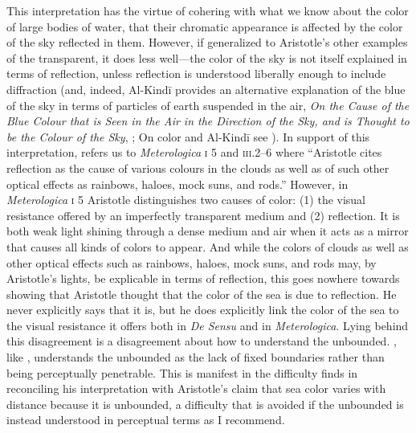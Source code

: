This interpretation has the virtue of cohering with what we know about the color of large bodies of water, that their chromatic appearance is affected by the color of the sky reflected in them. However, if generalized to Aristotle's other examples of the transparent, it does less well---the color of the sky is not itself explained in terms of reflection, unless reflection is understood liberally enough to include diffraction (and, indeed, Al-Kind\={i} provides an alternative explanation of the blue of the sky in terms of particles of earth suspended in the air, \emph{On the Cause of the Blue Colour that is Seen in the Air in the Direction of the Sky, and is Thought to be the Colour of the Sky}, \citealt[139--143]{Adamson:2012fk}; On color and Al-Kind\=i see \citealt{Adamson:2006ys}). In support of this interpretation, \citet[130]{Sorabji:2004fk} refers us to \emph{Meterologica} \textsc{i} 5 and \textsc{iii}.2--6 where ``Aristotle cites reflection as the cause of various colours in the clouds as well as of such other optical effects as rainbows, haloes, mock suns, and rods.'' However, in \emph{Meterologica} \textsc{i} 5 Aristotle distinguishes two causes of color: (1) the visual resistance offered by an imperfectly transparent medium and (2) reflection. It is both weak light shining through a dense medium and air when it acts as a mirror that causes all kinds of colors to appear. And while the colors of clouds as well as other optical effects such as rainbows, haloes, mock suns, and rods may, by Aristotle's lights, be explicable in terms of reflection, this goes nowhere towards showing that Aristotle thought that the color of the sea is due to reflection. He never explicitly says that it is, but he does explicitly link the color of the sea to the visual resistance it offers both in \emph{De Sensu} and in \emph{Meterologica}. Lying behind this disagreement is a disagreement about how to understand the unbounded. \citet{Sorabji:2004fk}, like \citet{Broackes:1999uq}, understands the unbounded as the lack of fixed boundaries rather than being perceptually penetrable. This is manifest in the difficulty \citet[131]{Sorabji:2004fk} finds in reconciling his interpretation with Aristotle's claim that sea color varies with distance because it is unbounded, a difficulty that is avoided if the unbounded is instead understood in perceptual terms as I recommend.

